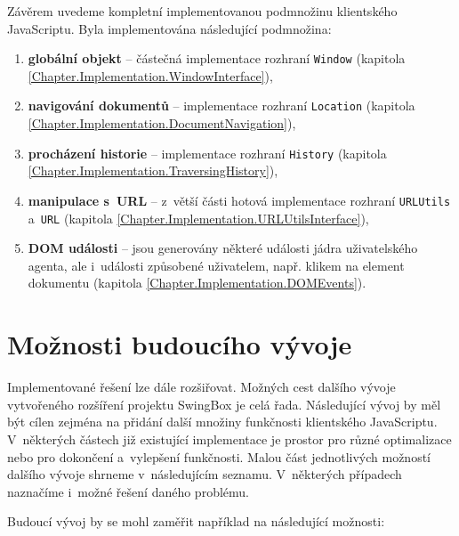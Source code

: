 Závěrem uvedeme kompletní implementovanou podmnožinu klientského JavaScriptu. Byla implementována následující podmnožina:

\begin{enumerate}
  \item \textbf{globální objekt} -- částečná implementace rozhraní \texttt{Window} (kapitola \ref{Chapter.Implementation.WindowInterface}),
  \item \textbf{navigování dokumentů} -- implementace rozhraní \texttt{Location} (kapitola \ref{Chapter.Implementation.DocumentNavigation}),
  \item \textbf{procházení historie} -- implementace rozhraní \texttt{History} (kapitola \ref{Chapter.Implementation.TraversingHistory}),
  \item \textbf{manipulace s~URL} -- z~větší části hotová implementace rozhraní \texttt{URLUtils} a~\texttt{URL} (kapitola \ref{Chapter.Implementation.URLUtilsInterface}),
  \item \textbf{DOM události} -- jsou generovány některé události jádra uživatelského agenta, ale i~události způsobené uživatelem, např. klikem na element dokumentu (kapitola \ref{Chapter.Implementation.DOMEvents}).
\end{enumerate}

\section{Možnosti budoucího vývoje}
\label{Chapter.PossibilitiesOfDevelopment}

Implementované řešení lze dále rozšiřovat. Možných cest dalšího vývoje vytvořeného rozšíření projektu SwingBox je celá řada. Následující vývoj by měl být cílen zejména na přidání další množiny funkčnosti klientského JavaScriptu. V~některých částech již existující implementace je prostor pro různé optimalizace nebo pro dokončení a~vylepšení funkčnosti. Malou část jednotlivých možností dalšího vývoje shrneme v~následujícím seznamu. V~některých případech naznačíme i~možné řešení daného problému.

\bigskip \noindent Budoucí vývoj by se mohl zaměřit například na následující možnosti:


